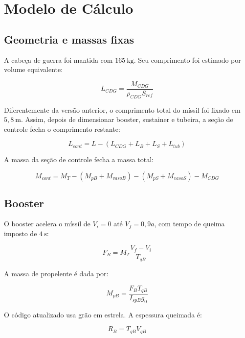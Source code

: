 ﻿\section{Modelo de Cálculo}

\subsection{Geometria e massas fixas}

A cabeça de guerra foi mantida com \(165~\text{kg}\). Seu comprimento foi estimado por volume equivalente:

\begin{equation}
    L_{CDG} = \frac{M_{CDG}}{\rho_{CDG}S_{ref}}
\end{equation}

Diferentemente da versão anterior, o comprimento total do míssil foi fixado em \(5{,}8~\text{m}\). Assim, depois de dimensionar booster, sustainer e tubeira, a seção de controle fecha o comprimento restante:

\begin{equation}
    L_{cont} = L - (L_{CDG}+L_B+L_S+L_{tub})
\end{equation}

A massa da seção de controle fecha a massa total:

\begin{equation}
    M_{cont}=M_T-(M_{pB}+M_{vasoB})-(M_{pS}+M_{vasoS})-M_{CDG}
\end{equation}

\subsection{Booster}

O booster acelera o míssil de \(V_i=0\) até \(V_f=0{,}9a\), com tempo de queima imposto de \(4~\text{s}\):

\begin{equation}
    F_B = M_T\frac{V_f - V_i}{T_{qB}}
\end{equation}

A massa de propelente é dada por:

\begin{equation}
    M_{pB}=\frac{F_BT_{qB}}{I_{spB}g_0}
\end{equation}

O código atualizado usa grão em estrela. A espessura queimada é:

\begin{equation}
    R_B = T_{qB}V_{qB}
\end{equation}

